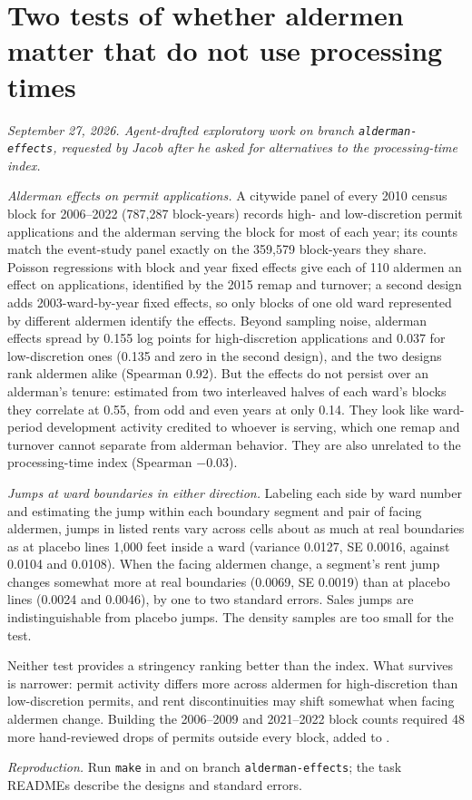 \clearpage
\section*{Two tests of whether aldermen matter that do not use processing times}
\textit{September 27, 2026. Agent-drafted exploratory work on branch \texttt{alderman-effects}, requested by Jacob
after he asked for alternatives to the processing-time index.}

\textit{Alderman effects on permit applications.} A citywide panel of every 2010 census block for 2006--2022 (787,287
block-years) records high- and low-discretion permit applications and the alderman serving the block for most of each
year; its counts match the event-study panel exactly on the 359,579 block-years they share. Poisson regressions with
block and year fixed effects give each of 110 aldermen an effect on applications, identified by the 2015 remap and
turnover; a second design adds 2003-ward-by-year fixed effects, so only blocks of one old ward represented by
different aldermen identify the effects. Beyond sampling noise, alderman effects spread by 0.155 log points for
high-discretion applications and 0.037 for low-discretion ones (0.135 and zero in the second design), and the two
designs rank aldermen alike (Spearman 0.92). But the effects do not persist over an alderman's tenure: estimated from
two interleaved halves of each ward's blocks they correlate at 0.55, from odd and even years at only 0.14. They look
like ward-period development activity credited to whoever is serving, which one remap and turnover cannot separate
from alderman behavior. They are also unrelated to the processing-time index (Spearman $-0.03$).

\textit{Jumps at ward boundaries in either direction.} Labeling each side by ward number and estimating the jump
within each boundary segment and pair of facing aldermen, jumps in listed rents vary across cells about as much at
real boundaries as at placebo lines 1,000 feet inside a ward (variance 0.0127, SE 0.0016, against 0.0104 and 0.0108).
When the facing aldermen change, a segment's rent jump changes somewhat more at real boundaries (0.0069, SE 0.0019)
than at placebo lines (0.0024 and 0.0046), by one to two standard errors. Sales jumps are indistinguishable from
placebo jumps. The density samples are too small for the test.

Neither test provides a stringency ranking better than the index. What survives is narrower: permit activity
differs more across aldermen for high-discretion than low-discretion permits, and rent discontinuities may shift
somewhat when facing aldermen change. Building the 2006--2009 and 2021--2022 block counts required 48 more
hand-reviewed drops of permits outside every block, added to .

\textit{Reproduction.} Run \texttt{make} in  and
 on branch \texttt{alderman-effects}; the task READMEs describe the
designs and standard errors.
